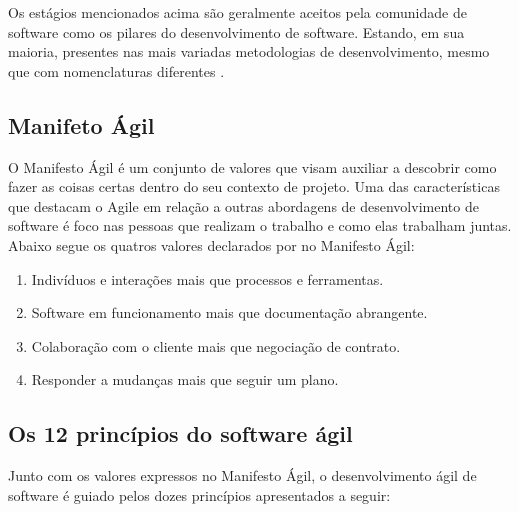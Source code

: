 Os estágios mencionados acima são geralmente aceitos pela comunidade de software
como os pilares do desenvolvimento de software. Estando, em sua maioria, presentes
nas mais variadas metodologias de desenvolvimento, mesmo que com nomenclaturas
diferentes \cite{Despa2014}.

\subsection{Manifeto Ágil}

O Manifesto Ágil é um conjunto de valores que visam auxiliar a descobrir como
fazer as coisas certas dentro do seu contexto de projeto. Uma das características
que destacam o Agile em relação a outras abordagens de desenvolvimento de software
é foco nas pessoas que realizam o trabalho e como elas trabalham juntas. Abaixo
segue os quatros valores declarados por  no Manifesto Ágil:

\begin{enumerate}
    \item Indivíduos e interações mais que processos e ferramentas.
    \item Software em funcionamento mais que documentação abrangente.
    \item Colaboração com o cliente mais que negociação de contrato.
    \item Responder a mudanças mais que seguir um plano.
\end{enumerate}

\subsection{Os 12 princípios do software ágil}

Junto com os valores expressos no Manifesto Ágil, o desenvolvimento ágil de software
é guiado pelos dozes princípios apresentados a seguir:

